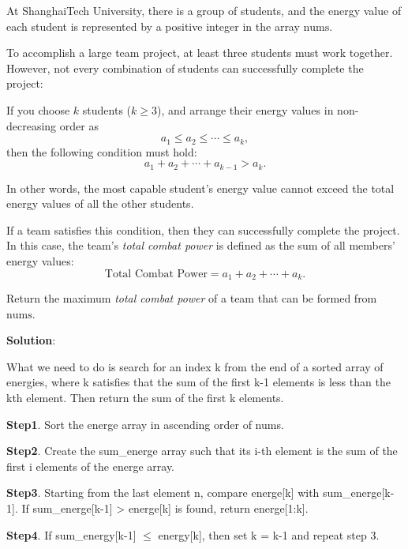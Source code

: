 \problem{}

At ShanghaiTech University, there is a group of students, and the energy value of each student is represented by a positive integer in the array \(\text{nums}\).

To accomplish a large team project, at least three students must work together.  
However, not every combination of students can successfully complete the project:

If you choose \(k\) students (\(k \geq 3\)), and arrange their energy values in non-decreasing order as
\[
a_1 \leq a_2 \leq \cdots \leq a_k,
\]
then the following condition must hold:
\[
a_1 + a_2 + \cdots + a_{k-1} > a_k.
\]

In other words, the most capable student’s energy value cannot exceed the total energy values of all the other students.  

If a team satisfies this condition, then they can successfully complete the project.  
In this case, the team’s \textit{total combat power} is defined as the sum of all members’ energy values:
\[
\text{Total Combat Power} = a_1 + a_2 + \cdots + a_k.
\]

Return the maximum \textit{total combat power} of a team that can be formed from \(\text{nums}\).

\noindent \textbf{Solution}:

What we need to do is search for an index k from the end of a sorted array of energies, where k satisfies that the sum of the first k-1 elements is less than the kth element. Then return the sum of the first k elements.

\noindent \textbf{Step1}. Sort the energe array in ascending order of nums.

\noindent \textbf{Step2}. 
Create the sum\_energe array such that its i-th element is the sum of the first i elements of the energe array.

\noindent \textbf{Step3}. Starting from the last element n, compare energe[k] with sum\_energe[k-1]. If sum\_energe[k-1] > energe[k] is found, return energe[1:k].


\noindent \textbf{Step4}. If sum\_energy[k-1] $\leq$ energy[k], then set k = k-1 and repeat step 3.

\newpage